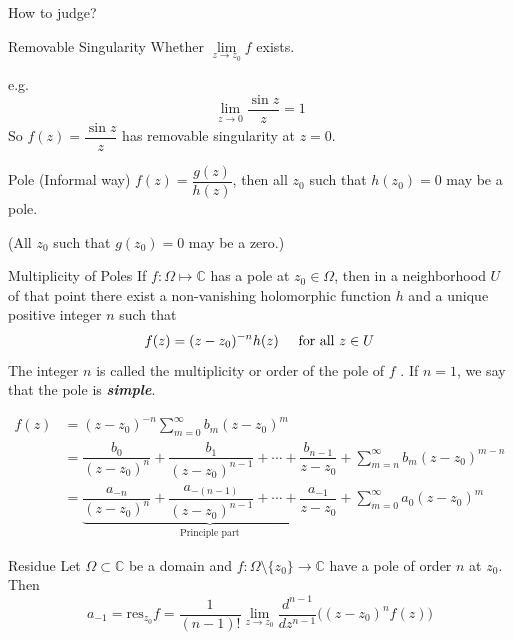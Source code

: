 \documentclass{beamer}
\begin{document}
\begin{frame}
\begin{block}{How to judge? }

\end{block}
\begin{block}{Removable Singularity}
Whether $\lim\limits_{z\rightarrow z_0}f$  exists.

e.g. 
$$\lim\limits_{z\rightarrow0}\dfrac{\sin z}{z}=1$$
So $f(z)=\dfrac{\sin z}{z}$ has removable singularity at $z=0$.
\end{block}
\begin{block}{Pole (Informal way)}
$f(z)=\dfrac{g(z)}{h(z)}$, then all $z_0$ such that $h(z_0)=0$ may be a pole.

 (All $z_0$ such that $g(z_0)=0$ may be a zero.)
\end{block}
\end{frame}

\begin{frame}
\begin{block}{Multiplicity of Poles}
If $f : \Omega\mapsto\mathbb{C}$ has a pole at $z_0\in\Omega$, then in a neighborhood $U$ of that point there exist a non-vanishing holomorphic function $h$ and a unique positive integer $n$ such that
$$f(z)=(z-z_0)^{-n}h(z)\hspace{5mm}\text{for all}\,\, z\in U$$
The integer $n$ is called the multiplicity
or order of the pole of $f$ . If $n = 1$, we say that the pole is \textcolor[rgb]{0,0.6,0.3}{\textbf{\textit{simple}}}.
\end{block}
\end{frame}

\begin{frame}
\begin{align*}
f(z)&=(z-z_0)^{-n}\sum\limits_{m=0}^{\infty}b_m(z-z_0)^m\\
&=\dfrac{b_0}{(z-z_0)^n}+\dfrac{b_1}{(z-z_0)^{n-1}}+\cdots+\dfrac{b_{n-1}}{z-z_0}+\sum\limits_{m=n}^{\infty}b_m(z-z_0)^{m-n}\\
&=\underbrace{\dfrac{a_{-n}}{(z-z_0)^n}+\dfrac{a_{-(n-1)}}{(z-z_0)^{n-1}}+\cdots+\dfrac{a_{-1}}{z-z_0}}_{\text{Principle part}}+\sum\limits_{m=0}^{\infty}a_0(z-z_0)^m
\end{align*}
\begin{block}{Residue}
Let $\Omega\subset\mathbb{C}$ be a domain and $f:\Omega\setminus\lbrace z_0\rbrace\rightarrow\mathbb{C}$ have a pole of order $n$ at $z_0$. Then
$$a_{-1}=\text{res}_{z_0}f=\dfrac{1}{(n-1)!}\lim_{z\rightarrow z_0}\dfrac{d^{n-1}}{dz^{n-1}}\big((z-z_0)^nf(z)\big)$$ 

\end{block}

\end{frame}
\end{document}
